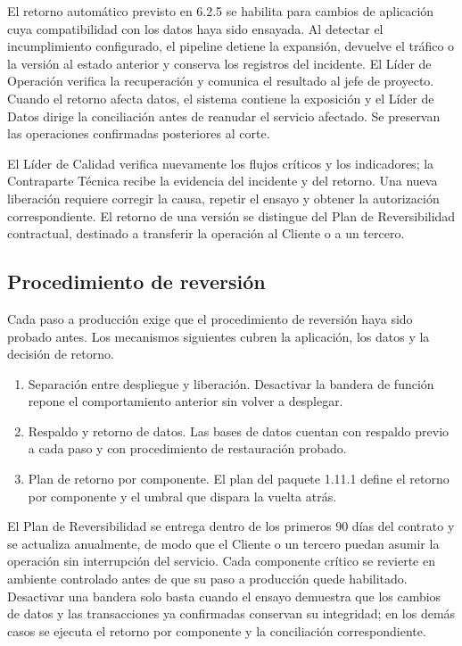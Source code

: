 \documentclass[11pt]{article}
\begin{document}
El retorno automático previsto en 6.2.5 se habilita para cambios de aplicación cuya compatibilidad con los datos haya sido ensayada. Al detectar el incumplimiento configurado, el pipeline detiene la expansión, devuelve el tráfico o la versión al estado anterior y conserva los registros del incidente. El Líder de Operación verifica la recuperación y comunica el resultado al jefe de proyecto. Cuando el retorno afecta datos, el sistema contiene la exposición y el Líder de Datos dirige la conciliación antes de reanudar el servicio afectado. Se preservan las operaciones confirmadas posteriores al corte.

El Líder de Calidad verifica nuevamente los flujos críticos y los indicadores; la Contraparte Técnica recibe la evidencia del incidente y del retorno. Una nueva liberación requiere corregir la causa, repetir el ensayo y obtener la autorización correspondiente. El retorno de una versión se distingue del Plan de Reversibilidad contractual, destinado a transferir la operación al Cliente o a un tercero.

\subsection*{Procedimiento de reversión}

Cada paso a producción exige que el procedimiento de reversión haya sido probado antes. Los mecanismos siguientes cubren la aplicación, los datos y la decisión de retorno.

\begin{enumerate}
\item Separación entre despliegue y liberación. Desactivar la bandera de función repone el comportamiento anterior sin volver a desplegar.
\item Respaldo y retorno de datos. Las bases de datos cuentan con respaldo previo a cada paso y con procedimiento de restauración probado.
\item Plan de retorno por componente. El plan del paquete 1.11.1 define el retorno por componente y el umbral que dispara la vuelta atrás.
\end{enumerate}

El Plan de Reversibilidad se entrega dentro de los primeros 90 días del contrato y se actualiza anualmente, de modo que el Cliente o un tercero puedan asumir la operación sin interrupción del servicio. Cada componente crítico se revierte en ambiente controlado antes de que su paso a producción quede habilitado. Desactivar una bandera solo basta cuando el ensayo demuestra que los cambios de datos y las transacciones ya confirmadas conservan su integridad; en los demás casos se ejecuta el retorno por componente y la conciliación correspondiente.
\end{document}
